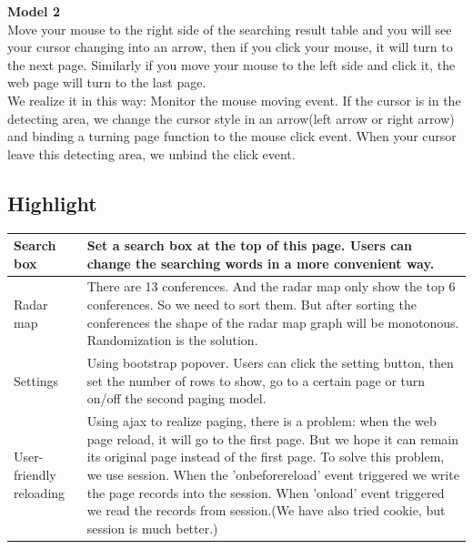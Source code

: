 \documentclass{article}
\begin{document}
	\noindent \textbf{Model 2}\\
	\indent Move your mouse to the right side of the searching result table and you will see your cursor changing into an arrow, then if you click your mouse, it will turn to the next page. Similarly if you move your mouse to the left side and click it, the web page will turn to the last page.\\
	\indent We realize it in this way: Monitor the mouse moving event. If the cursor is in the detecting area, we change the cursor style in an arrow(left arrow or right arrow) and binding a turning page function to the mouse click event. When your cursor leave this detecting area, we unbind the click event. 
	\subsection{Highlight}
	\begin{longtable}{|p{80pt}|p{340pt}|}
		\hline
		Search box&Set a search box at the top of this page. Users can change the searching words in a more convenient way.\\
		\hline
		Radar map&There are 13 conferences. And the radar map only show the top 6 conferences. So we need to sort them. But after sorting the conferences the shape of the radar map graph will be monotonous. Randomization is the solution.\\
		\hline
		Settings&Using bootstrap popover. Users can click the setting button, then set the number of rows to show, go to a certain page or turn on/off the second paging model.\\
		\hline
		User-friendly reloading&Using ajax to realize paging, there is a problem: when the web page reload, it will go to the first page. But we hope it can remain its original page instead of the first page. To solve this problem, we use session. When the 'onbeforereload' event triggered we write the page records into the session. When 'onload' event triggered we read the records from session.(We have also tried cookie, but session is much better.)\\
		\hline
	\end{longtable}
\end{document}
